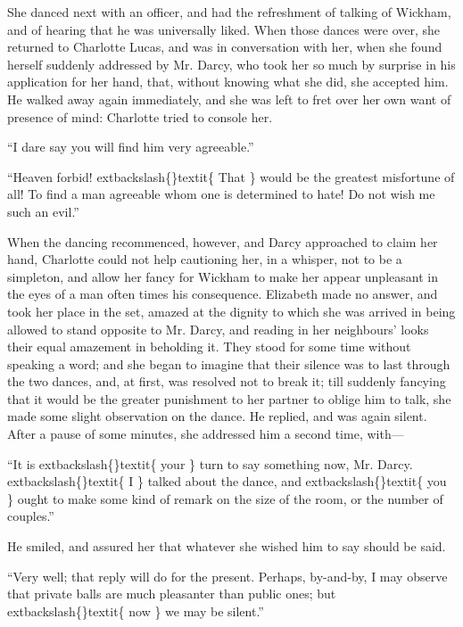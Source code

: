 \documentclass[10pt]{book}
\begin{document}
   She danced next with an officer, and had the refreshment of talking of
Wickham, and of hearing that he was universally liked. When those dances
were over, she returned to Charlotte Lucas, and was in conversation with
her, when she found herself suddenly addressed by Mr. Darcy, who took
her so much by surprise in his application for her hand, that, without
knowing what she did, she accepted him. He walked away again
immediately, and she was left to fret over her own want of presence of
mind: Charlotte tried to console her.
  

   “I dare say you will find him very agreeable.”
  

   “Heaven forbid!
   	extbackslash\{\}textit\{
    That
   \}
   would be the greatest misfortune of all! To find
a man agreeable whom one is determined to hate! Do not wish me such an
evil.”
  

   When the dancing recommenced, however, and Darcy approached to claim her
hand, Charlotte could not help cautioning her, in a whisper, not to be a
simpleton, and allow her fancy for Wickham to make her appear unpleasant
in the eyes of a man often times his consequence. Elizabeth made no
answer, and took her place in the set, amazed at the dignity to which
she was arrived in being allowed to stand opposite to Mr. Darcy, and
reading in her neighbours’ looks their equal amazement in beholding it.
They stood for some time without speaking a word; and she began to
imagine that their silence was to last through the two dances, and, at
first, was resolved not to break it; till suddenly fancying that it
would be the greater punishment to her partner to oblige him to talk,
   she made some slight observation on the dance. He replied, and was again
silent. After a pause of some minutes, she addressed him a second time,
with—
  

   “It is
   	extbackslash\{\}textit\{
    your
   \}
   turn to say something now, Mr. Darcy.
   	extbackslash\{\}textit\{
    I
   \}
   talked about the
dance, and
   	extbackslash\{\}textit\{
    you
   \}
   ought to make some kind of remark on the size of the
room, or the number of couples.”
  

   He smiled, and assured her that whatever she wished him to say should be
said.
  

   “Very well; that reply will do for the present. Perhaps, by-and-by, I
may observe that private balls are much pleasanter than public ones; but
   	extbackslash\{\}textit\{
    now
   \}
   we may be silent.”
  
\end{document}
